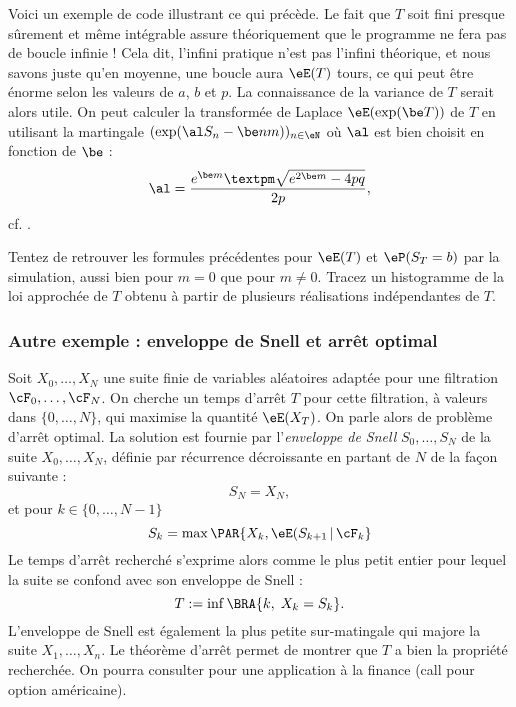 
Voici un exemple de code \ML{} illustrant ce qui précède. Le fait que
$T$ soit fini presque sûrement et même intégrable assure théoriquement
que le programme ne fera pas de boucle infinie !  Cela dit, l'infini
pratique n'est pas l'infini théorique, et nous savons juste qu'en
moyenne, une boucle aura $\eE(T)$ tours, ce qui peut être énorme selon
les valeurs de $a$, $b$ et $p$.  La connaissance de la variance de $T$
serait alors utile. On peut calculer la transformée de Laplace
$\eE(\exp(\be T))$ de $T$ en utilisant la martingale $(\exp(\al
S_n-\be n m))_{n\in\eN}$ où $\al$ est bien choisit en fonction de
$\be$ :
$$
\al=\frac{e^{\be m}±\sqrt{e^{2\be m}-4pq}}{2p},
$$
cf. \cite[exercice 8.8 page 247]{cottrell-duhamel}.

%
% 

Tentez de retrouver les formules précédentes pour $\eE(T)$ et
$\eP(S_T=b)$ par la simulation, aussi bien pour $m=0$ que pour $m\neq
0$. Tracez un histogramme de la loi approchée de $T$ obtenu à partir
de plusieurs réalisations indépendantes de $T$.

%
\subsubsection{Autre exemple : enveloppe de Snell et arrêt optimal}
%

Soit $X_0,\ldots,X_N$ une suite finie de variables aléatoires adaptée
pour une filtration $\cF_0,\ldots,\cF_N$. On cherche un temps d'arrêt
$T$ pour cette filtration, à valeurs dans $\{0,\ldots,N\}$, qui
maximise la quantité $\eE(X_T)$. On parle alors de problème d'arrêt
optimal. La solution est fournie par l'\emph{enveloppe de Snell}
$S_0,\ldots,S_N$ de la suite $X_0,\ldots,X_N$, définie par récurrence
décroissante en partant de $N$ de la façon suivante :
$$
S_N=X_N,
$$
et pour $k \in \{0,\ldots,N-1\}$
$$
S_k=\max\PAR{X_k,\eE(S_{k+1}\,\vert\,\cF_k}
$$
Le temps d'arrêt recherché s'exprime alors comme le plus petit entier
pour lequel la suite se confond avec son enveloppe de Snell :
$$
T:=\inf\BRA{k,\; X_k=S_k}.
$$
L'enveloppe de Snell est également la plus petite sur-matingale qui
majore la suite $X_1,\ldots,X_n$. Le théorème d'arrêt permet de
montrer que $T$ a bien la propriété recherchée.  On pourra consulter
\cite{lamberton-lapeyre} pour une application à la finance (call pour
option américaine).

